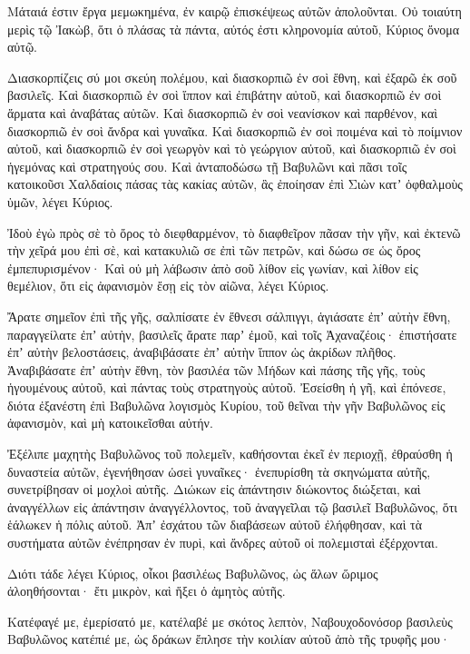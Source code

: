{Μάταιά ἐστιν ἔργα μεμωκημένα, ἐν καιρῷ ἐπισκέψεως αὐτῶν ἀπολοῦνται.
Οὐ τοιαύτη μερὶς τῷ Ἰακὼβ, ὅτι ὁ πλάσας τὰ πάντα, αὐτός ἐστι κληρονομία αὐτοῦ, Κύριος ὄνομα αὐτῷ.
\par }{\PP {}Διασκορπίζεις σύ μοι σκεύη πολέμου, καὶ διασκορπιῶ ἐν σοὶ ἔθνη, καὶ ἐξαρῶ ἐκ σοῦ βασιλεῖς.
Καὶ διασκορπιῶ ἐν σοὶ ἵππον καὶ ἐπιβάτην αὐτοῦ, καὶ διασκορπιῶ ἐν σοὶ ἅρματα καὶ ἀναβάτας αὐτῶν.
Καὶ διασκορπιῶ ἐν σοὶ νεανίσκον καὶ παρθένον, καὶ διασκορπιῶ ἐν σοὶ ἄνδρα καὶ γυναῖκα.
Καὶ διασκορπιῶ ἐν σοὶ ποιμένα καὶ τὸ ποίμνιον αὐτοῦ, καὶ διασκορπιῶ ἐν σοὶ γεωργὸν καὶ τὸ γεώργιον αὐτοῦ, καὶ διασκορπιῶ ἐν σοὶ ἡγεμόνας καὶ στρατηγούς σου.
Καὶ ἀνταποδώσω τῇ Βαβυλῶνι καὶ πᾶσι τοῖς κατοικοῦσι Χαλδαίοις πάσας τὰς κακίας αὐτῶν, ἃς ἐποίησαν ἐπὶ Σιὼν κατʼ ὀφθαλμοὺς ὑμῶν, λέγει Κύριος.
\par }{\PP {}Ἰδοὺ ἐγὼ πρὸς σὲ τὸ ὄρος τὸ διεφθαρμένον, τὸ διαφθεῖρον πᾶσαν τὴν γῆν, καὶ ἐκτενῶ τὴν χεῖρά μου ἐπὶ σὲ, καὶ κατακυλιῶ σε ἐπὶ τῶν πετρῶν, καὶ δώσω σε ὡς ὄρος ἐμπεπυρισμένον·
Καὶ οὐ μὴ λάβωσιν ἀπὸ σοῦ λίθον εἰς γωνίαν, καὶ λίθον εἰς θεμέλιον, ὅτι εἰς ἀφανισμὸν ἔσῃ εἰς τὸν αἰῶνα, λέγει Κύριος.
\par }{\PP {}Ἄρατε σημεῖον ἐπὶ τῆς γῆς, σαλπίσατε ἐν ἔθνεσι σάλπιγγι, ἁγιάσατε ἐπʼ αὐτὴν ἔθνη, παραγγείλατε ἐπʼ αὐτὴν, βασιλεῖς ἄρατε παρʼ ἐμοῦ, καὶ τοῖς Ἀχαναζέοις· ἐπιστήσατε ἐπʼ αὐτὴν βελοστάσεις, ἀναβιβάσατε ἐπʼ αὐτὴν ἵππον ὡς ἀκρίδων πλῆθος.
Ἀναβιβάσατε ἐπʼ αὐτὴν ἔθνη, τὸν βασιλέα τῶν Μήδων καὶ πάσης τῆς γῆς, τοὺς ἡγουμένους αὐτοῦ, καὶ πάντας τοὺς στρατηγοὺς αὐτοῦ.
Ἐσείσθη ἡ γῆ, καὶ ἐπόνεσε, διότα ἐξανέστη ἐπὶ Βαβυλῶνα λογισμὸς Κυρίου, τοῦ θεῖναι τὴν γῆν Βαβυλῶνος εἰς ἀφανισμὸν, καὶ μὴ κατοικεῖσθαι αὐτήν.
\par }{\PP {}Ἐξέλιπε μαχητὴς Βαβυλῶνος τοῦ πολεμεῖν, καθήσονται ἐκεῖ ἐν περιοχῇ, ἐθραύσθη ἡ δυναστεία αὐτῶν, ἐγενήθησαν ὡσεὶ γυναῖκες· ἐνεπυρίσθη τὰ σκηνώματα αὐτῆς, συνετρίβησαν οἱ μοχλοὶ αὐτῆς.
Διώκων εἰς ἀπάντησιν διώκοντος διώξεται, καὶ ἀναγγέλλων εἰς ἀπάντησιν ἀναγγέλλοντος, τοῦ ἀναγγεῖλαι τῷ βασιλεῖ Βαβυλῶνος, ὅτι ἑάλωκεν ἡ πόλις αὐτοῦ.
Ἀπʼ ἐσχάτου τῶν διαβάσεων αὐτοῦ ἐλήφθησαν, καὶ τὰ συστήματα αὐτῶν ἐνέπρησαν ἐν πυρὶ, καὶ ἄνδρες αὐτοῦ οἱ πολεμισταὶ ἐξέρχονται.
\par }{\PP {}Διότι τάδε λέγει Κύριος, οἶκοι βασιλέως Βαβυλῶνος, ὡς ἅλων ὥριμος ἀλοηθήσονται· ἔτι μικρὸν, καὶ ἥξει ὁ ἀμητὸς αὐτῆς.
\par }{\PP {}Κατέφαγέ με, ἐμερίσατό με, κατέλαβέ με σκότος λεπτὸν, Ναβουχοδονόσορ βασιλεὺς Βαβυλῶνος κατέπιέ με, ὡς δράκων ἔπλησε τὴν κοιλίαν αὐτοῦ ἀπὸ τῆς τρυφῆς μου·
}
